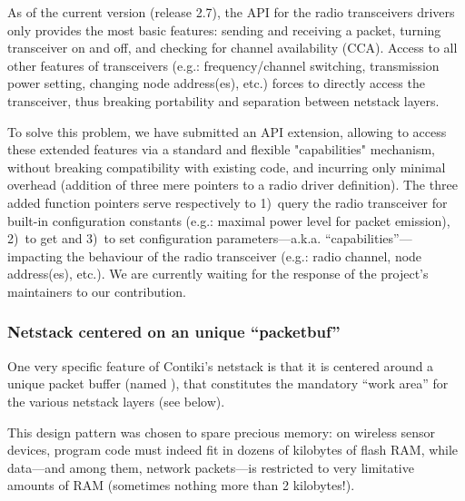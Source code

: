 \documentclass[12pt,twoside,a4paper]{article}
\begin{document}
As of the current version (release 2.7), the API for the radio transceivers
drivers only provides the most basic features: sending and receiving
a packet, turning transceiver on and off, and checking for channel
availability (CCA). Access to all other features of transceivers (e.g.:
frequency/channel switching, transmission power setting, changing node
address(es), etc.) forces to directly access the transceiver, thus breaking
portability and separation between netstack layers.

To solve this problem, we have submitted an API extension, allowing
to access these extended features via a standard and flexible "capabilities"
mechanism, without breaking compatibility with existing code, and incurring
only minimal overhead (addition of three mere pointers to a radio driver
definition). The three added function pointers serve respectively to
1)~query the radio transceiver for built-in configuration constants
(e.g.: maximal power level for packet emission), 2)~to get and
3)~to set configuration parameters---a.k.a. ``capabilities''---impacting
the behaviour of the radio transceiver (e.g.: radio channel,
node address(es), etc.). We are currently waiting for the
response of the project's maintainers to our contribution.


\subsubsection{Netstack centered on an unique ``packetbuf''}

One very specific feature of Contiki's netstack is that it is centered
around a unique packet buffer (named ), that constitutes
the mandatory ``work area'' for the various netstack layers (see below).

This design pattern was chosen to spare precious memory: on wireless sensor
devices, program code must indeed fit in dozens of kilobytes of flash RAM,
while data---and among them, network packets---is restricted to very
limitative amounts of RAM (sometimes nothing more than 2 kilobytes!).
\end{document}
